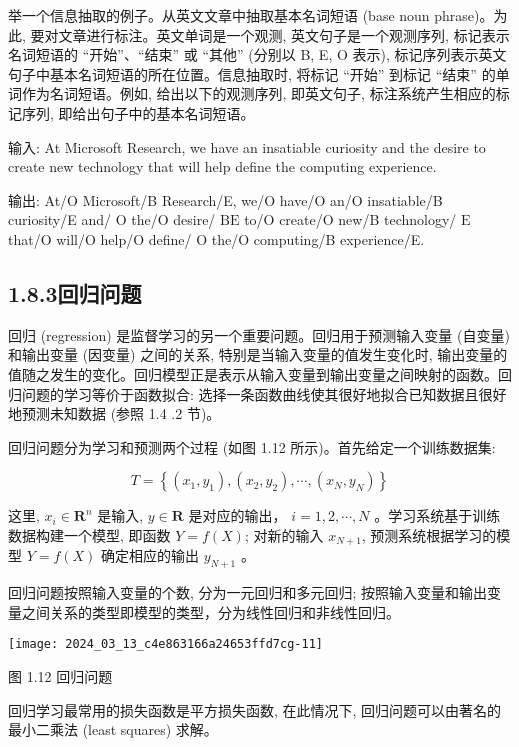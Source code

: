 \documentclass[10pt]{article}
\begin{document}
举一个信息抽取的例子。从英文文章中抽取基本名词短语 (base noun phrase)。为此, 要对文章进行标注。英文单词是一个观测, 英文句子是一个观测序列, 标记表示名词短语的 “开始”、“结束” 或 “其他” (分别以 B, E, O 表示), 标记序列表示英文句子中基本名词短语的所在位置。信息抽取时, 将标记 “开始” 到标记 “结束” 的单词作为名词短语。例如, 给出以下的观测序列, 即英文句子, 标注系统产生相应的标记序列, 即给出句子中的基本名词短语。

输入: At Microsoft Research, we have an insatiable curiosity and the desire to create new technology that will help define the computing experience.

输出: At/O Microsoft/B Research/E, we/O have/O an/O insatiable/B curiosity/E and/ $\mathrm{O}$ the/O desire/ $\mathrm{BE}$ to/O create/O new/B technology/ $\mathrm{E}$ that/O will/O help/O define/ $\mathrm{O}$ the/O computing/B experience/E.

\subsection*{1.8.3回归问题}
回归 (regression) 是监督学习的另一个重要问题。回归用于预测输入变量 (自变量) 和输出变量 (因变量) 之间的关系, 特别是当输入变量的值发生变化时, 输出变量的值随之发生的变化。回归模型正是表示从输入变量到输出变量之间映射的函数。回归问题的学习等价于函数拟合: 选择一条函数曲线使其很好地拟合已知数据且很好地预测未知数据 (参照 1.4 .2 节)。

回归问题分为学习和预测两个过程 (如图 1.12 所示)。首先给定一个训练数据集:

$$
T=\left\{\left(x_{1}, y_{1}\right),\left(x_{2}, y_{2}\right), \cdots,\left(x_{N}, y_{N}\right)\right\}
$$

这里, $x_{i} \in \boldsymbol{R}^{n}$ 是输入, $y \in \boldsymbol{R}$ 是对应的输出， $i=1,2, \cdots, N$ 。学习系统基于训练数据构建一个模型, 即函数 $Y=f(X)$; 对新的输入 $x_{N+1}$, 预测系统根据学习的模型 $Y=f(X)$ 确定相应的输出 $y_{N+1}$ 。

回归问题按照输入变量的个数, 分为一元回归和多元回归; 按照输入变量和输出变量之间关系的类型即模型的类型，分为线性回归和非线性回归。

\begin{center}
\texttt{[image: 2024\_03\_13\_c4e863166a24653ffd7cg-11]}
\end{center}

图 1.12 回归问题

回归学习最常用的损失函数是平方损失函数, 在此情况下, 回归问题可以由著名的最小二乘法 (least squares) 求解。
\end{document}
